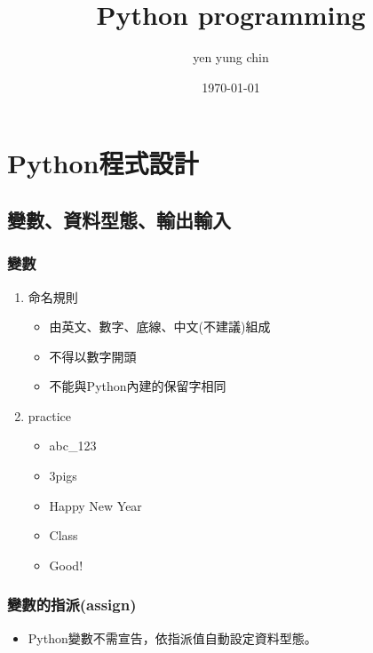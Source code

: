 \documentclass[a4paper,12pt]{article}
\author{yen yung chin}
\date{\today}
\title{Python programming}
\begin{document}
\maketitle
\tableofcontents



\section{Python程式設計}
\label{sec:orgfb5ffd5}
\subsection{變數、資料型態、輸出輸入}
\label{sec:org88bb171}
\subsubsection{變數}
\label{sec:orgc596e1c}
\begin{enumerate}
\item 命名規則
\label{sec:org315aad5}
\begin{itemize}itemsep=1pt
\item 由英文、數字、底線、中文(不建議)組成\\
\item 不得以數字開頭\\
\item 不能與Python內建的保留字相同\\
\end{itemize}
\item practice
\label{sec:org66743b3}
\begin{itemize}itemsep=2pt
\item abc\_123\\
\item 3pigs\\
\item Happy New Year\\
\item Class\\
\item Good!\\
\end{itemize}
\end{enumerate}

\subsubsection{變數的指派(assign)}
\label{sec:orge4a9153}
\begin{itemize}
\item Python變數不需宣告，依指派值自動設定資料型態。\\
\end{itemize}
\end{document}
